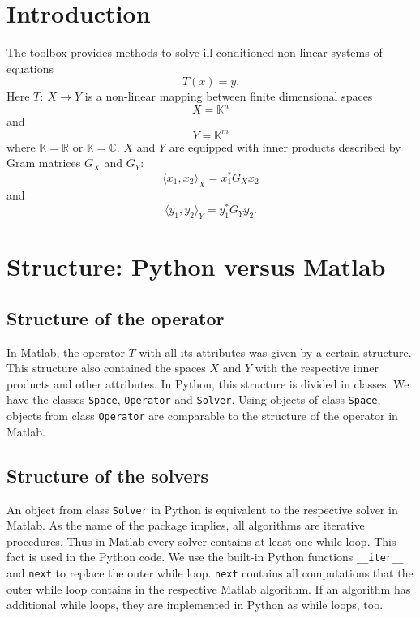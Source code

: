 \documentclass[12pt]{scrartcl}
\begin{document}
\newpage
\thispagestyle{empty}
\tableofcontents

\newpage
{}
\section{Introduction}
The toolbox provides methods to solve ill-conditioned non-linear systems of equations
$$T(x) = y.$$
Here  $T:~X \rightarrow Y$ is a non-linear mapping between finite dimensional spaces 
$$X = \mathbb{K}^n$$
and
$$Y = \mathbb{K}^m$$
where  $\mathbb{K}=\mathbb{R}$ or  $\mathbb{K}=\mathbb{C}$. $X$ and  $Y$ are equipped with inner products described by Gram matrices  $G_X$ and  $G_Y$:
$$\langle x_1,x_2 \rangle_X = x_1^\ast G_X x_2$$
and
$$\langle y_1,y_2 \rangle_Y = y_1^\ast G_Y y_2.$$
\section{Structure: Python versus Matlab}
\subsection{Structure of the operator}
In Matlab, the operator $T$ with all its attributes was given by a certain structure. This structure also contained the spaces $X$ and $Y$ with the respective inner products and other attributes. In Python, this structure is divided in classes. We have the classes \texttt{Space}, \texttt{Operator} and \texttt{Solver}. Using objects of class \texttt{Space}, objects from class \texttt{Operator} are comparable to the structure of the operator in Matlab.
\subsection{Structure of the solvers}
An object from class \texttt{Solver} in Python is equivalent to the respective solver in Matlab. As the name of the package implies, all algorithms are iterative procedures. Thus in Matlab every solver contains at least one while loop. This fact is used in the Python code. We use the built-in Python functions \texttt{\_\_iter\_\_} and \texttt{next} to replace the outer while loop. \texttt{next} contains all computations that the outer while loop contains in the respective Matlab algorithm. If an algorithm has additional while loops, they are implemented in Python as while loops, too.
\end{document}
